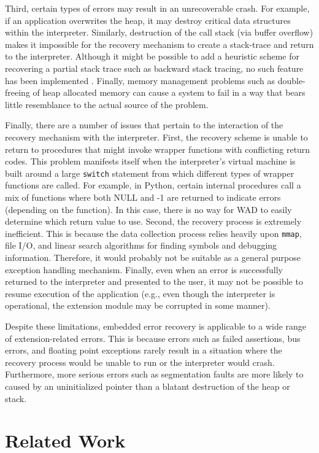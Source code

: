 Third, certain types of errors may result in an unrecoverable crash.
For example, if an application overwrites the heap, it may destroy
critical data structures within the interpreter. 
Similarly,
destruction of the call stack (via buffer overflow) makes it
impossible for the recovery mechanism to create a stack-trace and
return to the interpreter.  Although it might be possible to add a heuristic scheme for
recovering a partial stack trace such as backward stack tracing, no such feature has been implemented
\cite{debug}.  Finally, memory management problems such as
double-freeing of heap allocated memory can cause a system to fail in
a way that bears little resemblance to the actual source of the
problem.

Finally, there are a number of issues that pertain
to the interaction of the recovery mechanism with the interpreter.
First, the recovery scheme is unable to return to procedures
that might invoke wrapper functions with conflicting return codes.
This problem manifests itself when the interpreter's virtual
machine is built around a large {\tt switch} statement from which different
types of wrapper functions are called.  For example, in Python, certain
internal procedures call a mix of functions where both NULL and -1 are
returned to indicate errors (depending on the function).  In this case, there
is no way for WAD to easily determine which return value to use.  Second,
the recovery process is extremely inefficient.  This is because the
data collection process relies heavily upon {\tt mmap}, file I/O, and linear search
algorithms for finding symbols and debugging information.  Therefore, it would
probably not be suitable as a general purpose exception handling mechanism.
Finally, even when an error is successfully returned to the interpreter
and presented to the user, it may not be possible to resume execution of
the application (e.g., even though the interpreter is operational, the extension
module may be corrupted in some manner).

Despite these limitations, embedded error recovery is applicable to a
wide range of extension-related errors.  This is because errors such as
failed assertions, bus errors, and floating point exceptions rarely
result in a situation where the recovery process would be unable to run or the
interpreter would crash. Furthermore, more serious errors such as segmentation faults are more
likely to caused by an uninitialized pointer than a blatant
destruction of the heap or stack.

\section{Related Work}

